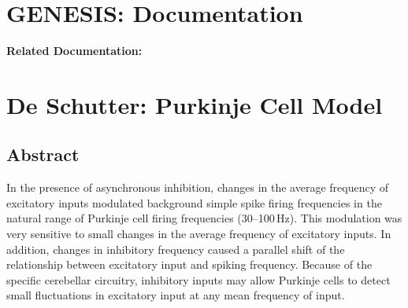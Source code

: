 \documentclass[12pt]{article}
\begin{document}
\section*{GENESIS: Documentation}

{\bf Related Documentation:}

\section*{De Schutter: Purkinje Cell Model}

\subsection*{Abstract}

In the presence of asynchronous inhibition, changes in the
average frequency of excitatory inputs modulated background simple
spike firing frequencies in the natural range of Purkinje cell
firing frequencies (30--100\,Hz). This modulation was very sensitive
to small changes in the average frequency of excitatory inputs.
In addition, changes in inhibitory frequency caused a parallel shift
of the relationship between excitatory input and spiking frequency.
Because of the specific cerebellar circuitry, inhibitory inputs
may allow Purkinje cells to detect small fluctuations in excitatory
input at any mean frequency of input.
\end{document}
